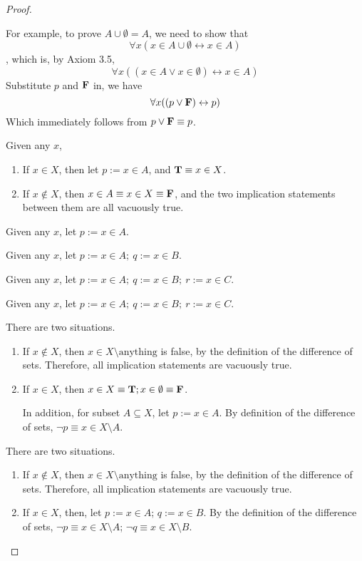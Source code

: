 \begin{proof}
\begin{enumabc}
		For example, to prove $A \cup \emptyset = A$, we need to show that
		\[
			\forall x(x \in A \cup \emptyset \leftrightarrow x \in A)
		\]
		, which is, by Axiom 3.5,
		\[
			\forall x((x \in A \vee x \in \emptyset) \leftrightarrow x \in A)
		\]
		Substitute $p$ and $\mathbf{F}$ in, we have
		\[
			\forall x((p \vee \mathbf{F}) \leftrightarrow p)
		\]
		Which immediately follows from $p \vee \mathbf{F} \equiv p$.
		
		\item Given any $x$, 
		\begin{enumerate}
			\item If $x \in X$, then let $p := x \in A$, and $\mathbf{T} \equiv x \in X$.
			\item If $x \notin X$, then $x \in A \equiv x \in X \equiv \mathbf{F}$, and the two implication statements between them are all vacuously true.
		\end{enumerate}
	
		\item Given any $x$, let $p := x \in A$.
		
		\item Given any $x$, let $p := x \in A;\ q := x \in B$.
		
		\item Given any $x$, let $p := x \in A;\ q := x \in B;\ r := x \in C$.
		
		\item Given any $x$, let $p := x \in A;\ q := x \in B;\ r := x \in C$.
		
		\item There are two situations.
		\begin{enumerate}
			\item If $x \notin X$, then $x \in X \setminus \text{anything}$ is false, by the definition of the difference of sets. Therefore, all implication statements are vacuously true.
			
			\item If $x \in X$, then $x \in X \equiv \mathbf{T}; x \in \emptyset \equiv \mathbf{F}$. 
			
			In addition, for subset $A \subseteq X$, let $p := x \in A$. By definition of the difference of sets, $\neg p \equiv x \in X \setminus A$.
		\end{enumerate}
	
			\item There are two situations.
			\begin{enumerate}
				\item If $x \notin X$, then $x \in X \setminus \text{anything}$ is false, by the definition of the difference of sets. Therefore, all implication statements are vacuously true.
				
				\item If $x \in X$, then, let $p := x \in A$; $q := x \in B$. By the definition of the difference of sets, $\neg p \equiv x \in X \setminus A$; $\neg q \equiv x \in X \setminus B$.
			\end{enumerate}
	\end{enumabc}
\end{proof}

